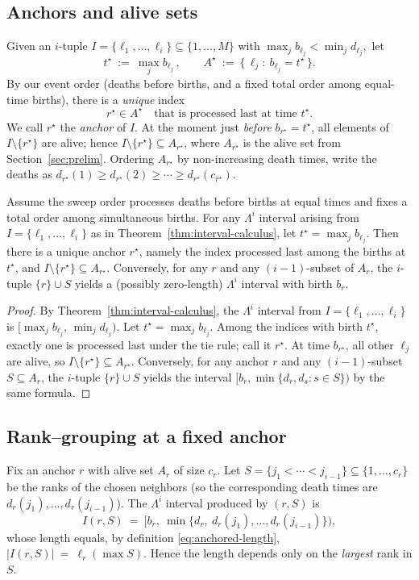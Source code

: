 \documentclass[runningheads]{llncs}
\newcommand{\Lam}{\Lambda}
\begin{document}
\subsection{Anchors and alive sets}
Given an $i$-tuple $I=\{\ell_1,\dots,\ell_i\}\subseteq\{1,\dots,M\}$ with
\(
\max_j b_{\ell_j}<\min_j d_{\ell_j},
\)
let
\[
t^\star \ :=\ \max_j b_{\ell_j}\,,\qquad
A^\star\ :=\ \{\,\ell_j:\ b_{\ell_j}=t^\star\,\}.
\]
By our event order (deaths before births, and a fixed total order among equal-time births), there is a \emph{unique} index
\[
r^\star\in A^\star\quad\text{that is processed last at time }t^\star.
\]
We call $r^\star$ the \emph{anchor} of $I$. At the moment just \emph{before} $b_{r^\star}=t^\star$, all elements of $I\setminus\{r^\star\}$ are alive; hence $I\setminus\{r^\star\}\subseteq A_{r^\star}$, where $A_{r^\star}$ is the alive set from Section~\ref{sec:prelim}. Ordering $A_{r^\star}$ by 
non-increasing death times, write the deaths as
\(
d_{r^\star}(1)\ge d_{r^\star}(2)\ge\cdots\ge d_{r^\star}(c_{r^\star}).
\)

\begin{lemma}\label{lem:anchor-unique}
Assume the sweep order processes deaths before births at equal times and fixes a total order among simultaneous births.  
For any $\Lam^i$ interval arising from $I=\{\ell_1,\dots,\ell_i\}$ as in Theorem~\ref{thm:interval-calculus}, let $t^\star=\max_j b_{\ell_j}$.  
Then there is a unique anchor $r^\star$, namely the index processed last among the births at $t^\star$, and $I\setminus\{r^\star\}\subseteq A_{r^\star}$.  
Conversely, for any $r$ and any $(i{-}1)$-subset of $A_r$, the $i$-tuple $\{r\}\cup S$ yields a (possibly zero-length) $\Lam^i$ interval with birth $b_r$.
\end{lemma}

\begin{proof}
By Theorem~\ref{thm:interval-calculus}, the $\Lambda^i$ interval from 
$I=\{\ell_1,\dots,\ell_i\}$ is 
$[\max_j b_{\ell_j},\,\min_j d_{\ell_j})$. 
Let $t^\star=\max_j b_{\ell_j}$. Among the indices with birth $t^\star$, exactly 
one is processed last under the tie rule; call it $r^\star$. 
At time $b_{r^\star}$, all other $\ell_j$ are alive, so 
$I\setminus\{r^\star\}\subseteq A_{r^\star}$. 
Conversely, for any anchor $r$ and any $(i-1)$-subset $S\subseteq A_r$, 
the $i$-tuple $\{r\}\cup S$ yields the interval 
$[b_r,\min\{d_r,d_s:s\in S\})$ by the same formula.
\end{proof}



\subsection{Rank–grouping at a fixed anchor}
Fix an anchor $r$ with alive set $A_r$ of size $c_r$. Let
$S=\{j_1<\cdots<j_{i-1}\}\subseteq \{1,\dots,c_r\}$ 
be the ranks of the chosen neighbors (so the corresponding death times are $d_r(j_1),\dots,d_r(j_{i-1})$). The $\Lam^i$ interval produced by $(r,S)$ is
\[
I(r,S)\ =\ \bigl[b_r,\ \min\{d_r,\ d_r(j_1),\dots,d_r(j_{i-1})\}\bigr),
\]
whose length equals, by definition \eqref{eq:anchored-length},
$|I(r,S)|\ =\ \ell_r(\max S).$
Hence the length depends only on the \emph{largest} rank in $S$.
\end{document}
